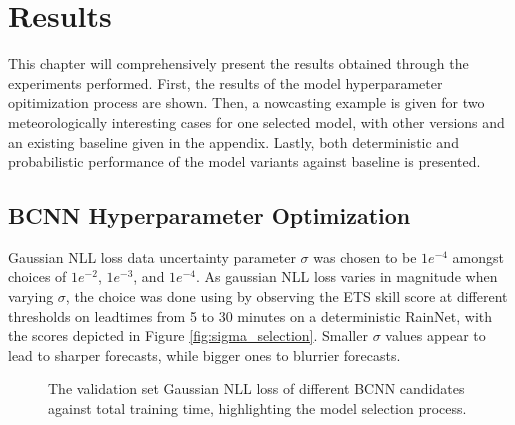 \chapter{Results}
\label{chapter:results}

This chapter will comprehensively present the results obtained through the experiments performed. First, the results of the model hyperparameter opitimization process are shown. Then, a nowcasting example is given for two meteorologically interesting cases for one selected model, with other versions and an existing baseline given in the appendix. Lastly, both deterministic and probabilistic performance of the model variants against baseline is presented. 

\section{BCNN Hyperparameter Optimization}

Gaussian NLL loss data uncertainty parameter $\sigma$ was chosen to be $1e^{-4}$ amongst choices of $1e^{-2}$, $1e^{-3}$, and $1e^{-4}$. As gaussian NLL loss varies in magnitude when varying $\sigma$, the choice was done using by observing the ETS skill score at different thresholds on leadtimes from 5 to 30 minutes on a deterministic RainNet, with the scores depicted in Figure \ref{fig:sigma_selection}. Smaller $\sigma$ values appear to lead to sharper forecasts, while bigger ones to blurrier forecasts.

\begin{figure}[H]
	\centering
	\caption{The validation set Gaussian NLL loss of different BCNN candidates against total training time, highlighting the model selection process.}
	\label{fig:convergence-bcnn}
\end{figure}

